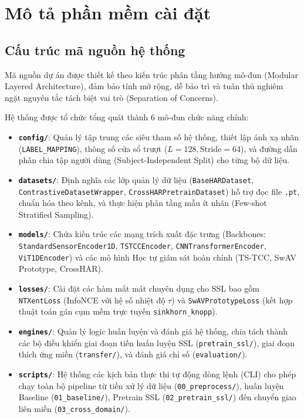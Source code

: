 \section{Mô tả phần mềm cài đặt}

\subsection{Cấu trúc mã nguồn hệ thống}
Mã nguồn dự án được thiết kế theo kiến trúc phân tầng hướng mô-đun (Modular Layered Architecture), đảm bảo tính mở rộng, dễ bảo trì và tuân thủ nghiêm ngặt nguyên tắc tách biệt vai trò (Separation of Concerns).

Hệ thống được tổ chức tổng quát thành 6 mô-đun chức năng chính:

\begin{itemize}
    \item \textbf{\texttt{config/}}: Quản lý tập trung các siêu tham số hệ thống, thiết lập ánh xạ nhãn (\texttt{LABEL\_MAPPING}), thông số cửa sổ trượt ($L=128, \text{Stride}=64$), và đường dẫn phân chia tập người dùng (Subject-Independent Split) cho từng bộ dữ liệu.
    \item \textbf{\texttt{datasets/}}: Định nghĩa các lớp quản lý dữ liệu (\texttt{BaseHARDataset}, \texttt{ContrastiveDatasetWrapper}, \texttt{CrossHARPretrainDataset}) hỗ trợ đọc file \texttt{.pt}, chuẩn hóa theo kênh, và thực hiện phân tầng mẫu ít nhãn (Few-shot Stratified Sampling).
    \item \textbf{\texttt{models/}}: Chứa kiến trúc các mạng trích xuất đặc trưng (Backbones: \texttt{StandardSensorEncoder1D}, \texttt{TSTCCEncoder}, \texttt{CNNTransformerEncoder}, \texttt{ViT1DEncoder}) và các mô hình Học tự giám sát hoàn chỉnh (TS-TCC, SwAV Prototype, CrossHAR).
    \item \textbf{\texttt{losses/}}: Cài đặt các hàm mất mát chuyên dụng cho SSL bao gồm \texttt{NTXentLoss} (InfoNCE với hệ số nhiệt độ $\tau$) và \texttt{SwAVPrototypeLoss} (kết hợp thuật toán gán cụm mềm trực tuyến \texttt{sinkhorn\_knopp}).
    \item \textbf{\texttt{engines/}}: Quản lý logic huấn luyện và đánh giá hệ thống, chia tách thành các bộ điều khiển giai đoạn tiền huấn luyện SSL (\texttt{pretrain\_ssl/}), giai đoạn thích ứng miền (\texttt{transfer/}), và đánh giá chỉ số (\texttt{evaluation/}).
    \item \textbf{\texttt{scripts/}}: Hệ thống các kịch bản thực thi tự động dòng lệnh (CLI) cho phép chạy toàn bộ pipeline từ tiền xử lý dữ liệu (\texttt{00\_preprocess/}), huấn luyện Baseline (\texttt{01\_baseline/}), Pretrain SSL (\texttt{02\_pretrain\_ssl/}) đến chuyển giao liên miền (\texttt{03\_cross\_domain/}).
\end{itemize}

